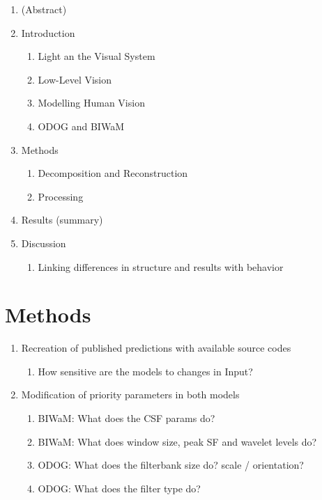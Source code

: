 \begin{enumerate}
    \item (Abstract)
    \item Introduction
    \begin{enumerate}
        \item Light an the Visual System
        \item Low-Level Vision
        \item Modelling Human Vision
        \item ODOG and BIWaM
    \end{enumerate}
    \item Methods %
        \begin{enumerate}
            \item Decomposition and Reconstruction
            \item Processing
        \end{enumerate}
    \item Results (summary)
    \item Discussion
    \begin{enumerate}
        \item Linking differences in structure and results with behavior
    \end{enumerate}
\end{enumerate}



\section{Methods}
\begin{enumerate}
    \item Recreation of published predictions with available source codes
    \begin{enumerate}
        \item How sensitive are the models to changes in Input?
    \end{enumerate}
    \item Modification of priority parameters in both models
    \begin{enumerate}
        \item BIWaM: What does the CSF params do?
        \item BIWaM: What does window size, peak SF and wavelet levels do?
        \item ODOG: What does the filterbank size do? scale / orientation?
        \item ODOG: What does the filter type do?
    \end{enumerate}
\end{enumerate}

